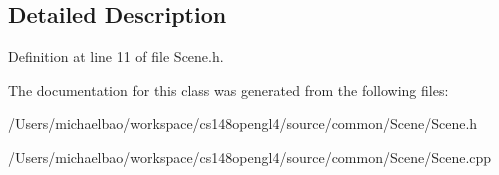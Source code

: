 \subsection{Detailed Description}


Definition at line 11 of file Scene.\+h.



The documentation for this class was generated from the following files\+:\begin{DoxyCompactItemize}
\item 
/\+Users/michaelbao/workspace/cs148opengl4/source/common/\+Scene/Scene.\+h\item 
/\+Users/michaelbao/workspace/cs148opengl4/source/common/\+Scene/Scene.\+cpp\end{DoxyCompactItemize}
